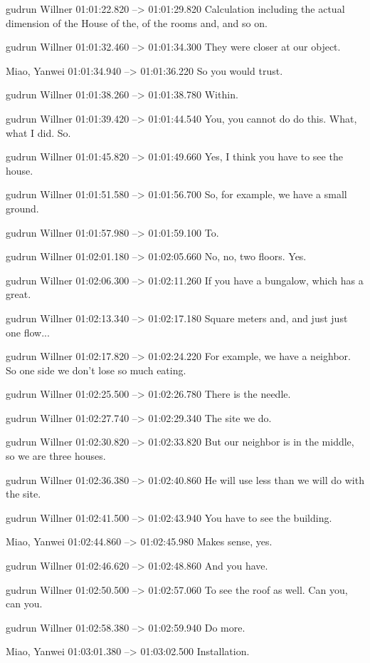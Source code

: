 {gudrun Willner 01:01:22.820 --> 01:01:29.820
Calculation including the actual dimension of the House of the, of the rooms and, and so on.

gudrun Willner 01:01:32.460 --> 01:01:34.300
They were closer at our object.

Miao, Yanwei 01:01:34.940 --> 01:01:36.220
So you would trust.

gudrun Willner 01:01:38.260 --> 01:01:38.780
Within.

gudrun Willner 01:01:39.420 --> 01:01:44.540
You, you cannot do do this. What, what I did. So.

gudrun Willner 01:01:45.820 --> 01:01:49.660
Yes, I think you have to see the house.

gudrun Willner 01:01:51.580 --> 01:01:56.700
So, for example, we have a small ground.

gudrun Willner 01:01:57.980 --> 01:01:59.100
To.

gudrun Willner 01:02:01.180 --> 01:02:05.660
No, no, two floors. Yes.

gudrun Willner 01:02:06.300 --> 01:02:11.260
If you have a bungalow, which has a great.

gudrun Willner 01:02:13.340 --> 01:02:17.180
Square meters and, and just just one flow...

gudrun Willner 01:02:17.820 --> 01:02:24.220
For example, we have a neighbor. So one side we don't lose so much eating.

gudrun Willner 01:02:25.500 --> 01:02:26.780
There is the needle.

gudrun Willner 01:02:27.740 --> 01:02:29.340
The site we do.

gudrun Willner 01:02:30.820 --> 01:02:33.820
But our neighbor is in the middle, so we are three houses.

gudrun Willner 01:02:36.380 --> 01:02:40.860
He will use less than we will do with the site.

gudrun Willner 01:02:41.500 --> 01:02:43.940
You have to see the building.

Miao, Yanwei 01:02:44.860 --> 01:02:45.980
Makes sense, yes.

gudrun Willner 01:02:46.620 --> 01:02:48.860
And you have.

gudrun Willner 01:02:50.500 --> 01:02:57.060
To see the roof as well. Can you, can you.

gudrun Willner 01:02:58.380 --> 01:02:59.940
Do more.

Miao, Yanwei 01:03:01.380 --> 01:03:02.500
Installation.

}
